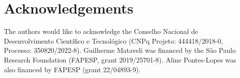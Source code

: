 \section{Acknowledgements}

The authors would like to acknowledge the Conselho Nacional de Desenvolvimento 
Científico e Tecnológico (CNPq Projeto: 444418/2018-0, Processo: 350820/2022-8). 
Guilherme Mataveli was financed by the São Paulo Research Foundation (FAPESP, 
grant 2019/25701-8).
Aline Pontes-Lopes was also financed by FAPESP (grant 22/04893-9).
